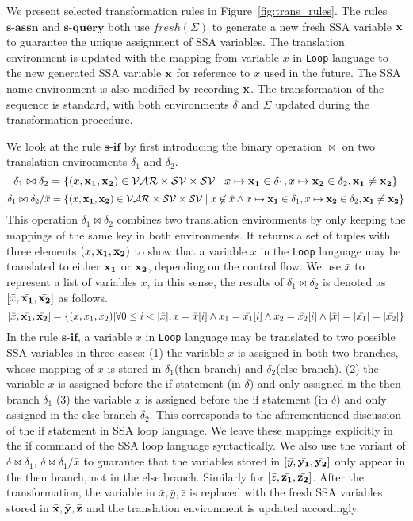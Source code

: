We present selected transformation rules in Figure~\ref{fig:trans_rules}. The rules $\textbf{s-assn}$ and $\textbf{s-query}$ both use $fresh(\Sigma)$ to generate a new fresh SSA variable ${\bf{{x}}}$ to guarantee the unique assignment of SSA variables. The translation environment is updated with the mapping from variable $x$ in {\tt Loop} language to the new generated SSA variable ${\bf{{x}}}$ for reference to $x$ used in the future. The SSA name environment is also modified by recording ${\bf{{x}}}$. The transformation of the sequence is standard, with both environments $\delta$ and $\Sigma$ updated during the transformation procedure.   

We look at the rule $\textbf{s-if}$ by first introducing the binary operation $\bowtie$ on two translation environments $\delta_1$ and $\delta_2$. 
\[ \delta_1 \bowtie \delta_2 = \{ ( x, {{\bf{{x_1}}}, {\bf{{x_2}}}} ) \in \mathcal{VAR} \times \mathcal{SV} \times \mathcal{SV} \mid x \mapsto {{\bf{{x_1}}}} \in \delta_1 , x \mapsto {{\bf{{x_2}}} } \in \delta_2, {{\bf{{x_1}}} \not= {{\bf{{x_2}}} }  }  \} \]
\[ \delta_1 \bowtie \delta_2 / \bar{x} = \{ ( x, {{\bf{{x_1}}}, {\bf{{x_2}}}} ) \in \mathcal{VAR} \times \mathcal{SV} \times \mathcal{SV} \mid x \not\in \bar{x} \land x \mapsto {{\bf{{x_1}}}} \in \delta_1 , x \mapsto {{\bf{{x_2}}} } \in \delta_2, {{\bf{{x_1}}} \not= {{\bf{{x_2}}} }   }  \} \]
This operation $\delta_1 \bowtie \delta_2$ combines two translation environments by only keeping the mappings of the same key in both environments. It returns a set of tuples with three elements $(x,{\bf{{x_1}}}, {\bf{{x_2}}})$ to show that a variable $x$ in the {\tt Loop} language may be translated to either ${\bf{{x_1}}}$ or ${\bf{{x_2}}}$, depending on the control flow. We use $\bar{x}$ to represent a list of variables $x$, in this sense, the results of  $\delta_1 \bowtie \delta_2$ is denoted as $ [\bar{x}, \bar{{\bf{{x_1}}}}, \bar{{\bf{{x_2}}}}]$ as follows.
\[
 [\bar{x}, \bar{{\bf{{x_1}}}}, \bar{{\bf{{x_2}}}}] = \{ (x, x_1,x_2)  | \forall 0 \leq i < |\bar{x}|, x = \bar{x }[i] \land x_1 = \bar{x_1}[i] \land x_2 = \bar{x_2 }[i] \land |\bar{x}| = |\bar{x_1}| = |\bar{x_2}|   \}
\]
In the rule $\textbf{s-if}$, a variable $x$ in {\tt Loop} language may be translated to two possible SSA variables in three cases: (1) the variable $x$ is assigned in both two branches, whose mapping of $x$ is stored in $\delta_1$(then branch) and $\delta_2$(else branch). (2) the variable $x$ is assigned before the if statement (in $\delta$) and only assigned in the then branch $\delta_1$ (3) the variable $x$ is assigned before the if statement (in $\delta$) and only assigned in the else branch $\delta_2$. This corresponds to the aforementioned discussion of the if statement in SSA loop language. We leave these mappings explicitly in the if command of the SSA loop language syntactically. We also use the variant of $\delta \bowtie \delta_1$, $\delta \bowtie \delta_1 / \bar{x}$ to guarantee that the variables stored in $ [\bar{y}, \bar{{\bf{{y_1}}}}, \bar{{\bf{{y_2}}}}]$ only appear in the then branch, not in the else branch. Similarly for $ [\bar{z}, \bar{{\bf{{z_1}}}}, \bar{{\bf{{z_2}}}}]$. After the transformation, the variable in $\bar{x}, \bar{y}, \bar{z}$ is replaced with the fresh SSA variables stored in $\bar{{\bf{{x}}}},\bar{{\bf{{y}}}},\bar{{\bf{{z}}}}$ and the translation environment is updated accordingly.    

